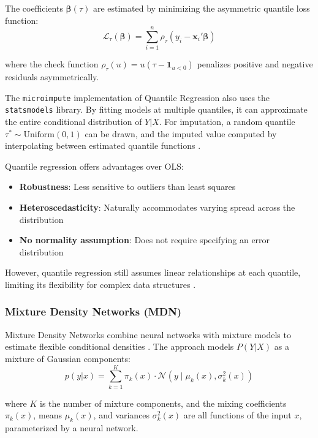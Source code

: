 The coefficients $\boldsymbol{\beta}(\tau)$ are estimated by minimizing the asymmetric quantile loss function:
\begin{equation}
    \mathcal{L}_\tau(\boldsymbol{\beta}) = \sum_{i=1}^{n} \rho_\tau(y_i - \boldsymbol{x}_i'\boldsymbol{\beta})
\end{equation}

where the check function $\rho_\tau(u) = u(\tau - \mathbf{1}_{u<0})$ penalizes positive and negative residuals asymmetrically.

The \texttt{microimpute} implementation of Quantile Regression also uses the \texttt{statsmodels} library. By fitting models at multiple quantiles, it can approximate the entire conditional distribution of $Y|X$. For imputation, a random quantile $\tau^* \sim \text{Uniform}(0,1)$ can be drawn, and the imputed value computed by interpolating between estimated quantile functions \citep{wei2014multiple}.

Quantile regression offers advantages over OLS:
\begin{itemize}
    \item \textbf{Robustness}: Less sensitive to outliers than least squares
    \item \textbf{Heteroscedasticity}: Naturally accommodates varying spread across the distribution
    \item \textbf{No normality assumption}: Does not require specifying an error distribution
\end{itemize}

However, quantile regression still assumes linear relationships at each quantile, limiting its flexibility for complex data structures \citep{meinshausen2006quantile}.

\subsubsection{Mixture Density Networks (MDN)}

Mixture Density Networks combine neural networks with mixture models to estimate flexible conditional densities \citep{bishop1994mixture}. The approach models $P(Y|X)$ as a mixture of Gaussian components:
\begin{equation}
    p(y|x) = \sum_{k=1}^{K} \pi_k(x) \cdot \mathcal{N}(y \mid \mu_k(x), \sigma_k^2(x))
\end{equation}

where $K$ is the number of mixture components, and the mixing coefficients $\pi_k(x)$, means $\mu_k(x)$, and variances $\sigma_k^2(x)$ are all functions of the input $x$, parameterized by a neural network.

